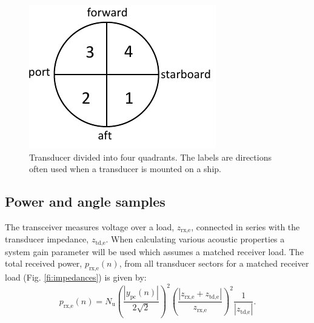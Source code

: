 \documentclass[preprint,12pt,TurnOnLineNumbers]{JASAnew}
\newcommand{\samplesymt}{n}
\newcommand{\nchannels}{N_{\textrm{u}}}
\newcommand{\zrxe}{z_{\textrm{rx,e}}}
\newcommand{\ztde}{z_{\textrm{td,e}}}
\newcommand{\prxe}{p_{\textrm{rx,e}}}
\newcommand{\ypc}{y_{\textrm{pc}}}
\begin{document}
\begin{figure}
\includegraphics{Fig_trd_quad}
\caption{\label{fi:trd_quad}Transducer divided into four quadrants. The labels are directions often used when a transducer is mounted on a ship.}
\end{figure}
%


\subsection{Power and angle samples}
The transceiver measures voltage over a load, $\zrxe$, connected in series with the transducer impedance, $\ztde$. When calculating various acoustic properties a system gain parameter will be used which assumes a matched receiver load. The total received power, $\prxe(\samplesymt)$, from all transducer sectors for a matched receiver load (Fig. \ref{fi:impedances}) is given by: 
\begin{equation}
\label{eq:prx}
\prxe(\samplesymt) = \nchannels\left( \frac{|\ypc(\samplesymt)|}{2\sqrt{2}} \right)^2 \left( \frac{|\zrxe+\ztde|}{\zrxe} \right)^2 \frac{1}{|\ztde|}.
\end{equation}
\end{document}
